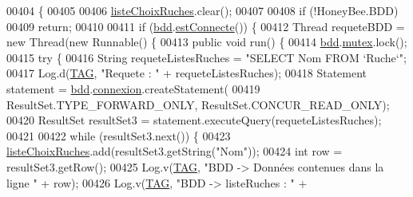 \begin{DoxyCode}
00404                                        \{
00405 
00406         \hyperlink{classfr_1_1campus_1_1laurainc_1_1honeybee_1_1_ruche_accb6ae9a3a546857525f0e1cdc023250}{listeChoixRuches}.clear();
00407 
00408         \textcolor{keywordflow}{if} (!HoneyBee.BDD)
00409             \textcolor{keywordflow}{return};
00410 
00411         \textcolor{keywordflow}{if} (\hyperlink{classfr_1_1campus_1_1laurainc_1_1honeybee_1_1_ruche_a0eb43a2b63fb83e9d5af6cd6b754c7da}{bdd}.\hyperlink{classfr_1_1campus_1_1laurainc_1_1honeybee_1_1_base_de_donnees_a735f54c2c183a595c9a9a5ba947491f5}{estConnecte}()) \{
00412             Thread requeteBDD = \textcolor{keyword}{new} Thread(\textcolor{keyword}{new} Runnable() \{
00413                 \textcolor{keyword}{public} \textcolor{keywordtype}{void} run() \{
00414                     \hyperlink{classfr_1_1campus_1_1laurainc_1_1honeybee_1_1_ruche_a0eb43a2b63fb83e9d5af6cd6b754c7da}{bdd}.\hyperlink{classfr_1_1campus_1_1laurainc_1_1honeybee_1_1_base_de_donnees_a0dd6f285a11459c086adea6080bed282}{mutex}.lock();
00415                     \textcolor{keywordflow}{try} \{
00416                         String requeteListesRuches = \textcolor{stringliteral}{"SELECT Nom FROM `Ruche`"};
00417                         Log.d(\hyperlink{classfr_1_1campus_1_1laurainc_1_1honeybee_1_1_ruche_a44739cbb0fa7451c1edc240a3f51c257}{TAG}, \textcolor{stringliteral}{"Requete : "} + requeteListesRuches);
00418                         Statement statement = \hyperlink{classfr_1_1campus_1_1laurainc_1_1honeybee_1_1_ruche_a0eb43a2b63fb83e9d5af6cd6b754c7da}{bdd}.\hyperlink{classfr_1_1campus_1_1laurainc_1_1honeybee_1_1_base_de_donnees_a358899633f17b8cd00dd2c4cfdd40abe}{connexion}.createStatement(
00419                         ResultSet.TYPE\_FORWARD\_ONLY, ResultSet.CONCUR\_READ\_ONLY);
00420                         ResultSet resultSet3 = statement.executeQuery(requeteListesRuches);
00421 
00422                         \textcolor{keywordflow}{while} (resultSet3.next()) \{
00423                             \hyperlink{classfr_1_1campus_1_1laurainc_1_1honeybee_1_1_ruche_accb6ae9a3a546857525f0e1cdc023250}{listeChoixRuches}.add(resultSet3.getString(\textcolor{stringliteral}{"Nom"}));
00424                             \textcolor{keywordtype}{int} row = resultSet3.getRow();
00425                             Log.v(\hyperlink{classfr_1_1campus_1_1laurainc_1_1honeybee_1_1_ruche_a44739cbb0fa7451c1edc240a3f51c257}{TAG}, \textcolor{stringliteral}{"BDD -> Données contenues dans la ligne "} + row);
00426                             Log.v(\hyperlink{classfr_1_1campus_1_1laurainc_1_1honeybee_1_1_ruche_a44739cbb0fa7451c1edc240a3f51c257}{TAG}, \textcolor{stringliteral}{"BDD -> listeRuches : "} + 

\end{DoxyCode}
